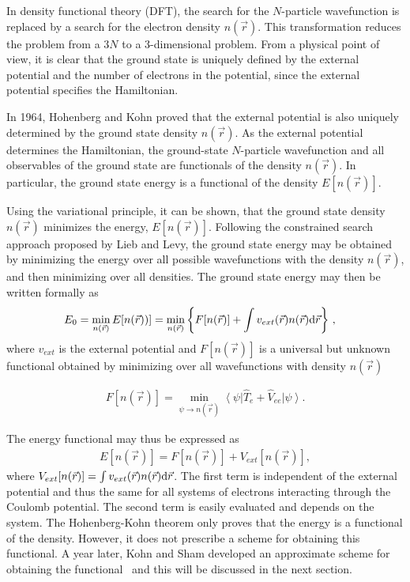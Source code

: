 \documentclass[book.tex]{subfiles}
\begin{document}
In density functional theory (DFT), the search for the $N$-particle wavefunction is replaced by a search for the electron density $n(\vec{r})$. This transformation reduces the problem from a $3N$ to a 3-dimensional problem.  From a physical point of view, it is clear that the ground state is uniquely defined by the external potential and the number of electrons in the potential, since the external potential specifies the Hamiltonian.

In 1964, Hohenberg and Kohn proved that the external potential is also uniquely determined by the ground state density $n(\vec{r})$.\cite{hohenbergkohn:1964} As the external potential determines the Hamiltonian, the ground-state $N$-particle wavefunction and all observables of the ground state are functionals of the density $n(\vec{r})$. In particular, the ground state energy is a functional of the density $E[n(\vec{r})]$. 

Using the variational principle, it can be shown,\cite{kohn:nobel} that the ground state density $n(\vec{r})$ minimizes the energy, $E[n(\vec{r})]$. Following the constrained search approach proposed by Lieb and Levy,\cite{Lieb:icqc:24,levy:preva:26} the ground state energy may be obtained by minimizing the energy over all possible wavefunctions with the density $n(\vec{r})$, and then minimizing over all densities.
The ground state energy may then be written formally as 
\begin{align}
E_0=\min_{n(\vec{r})} E[n(\vec{r}))]&=\min_{n(\vec{r})} \left\{ F[n(\vec{r})]+\int v_{ext}(\vec{r}) n(\vec{r}) \textup{d}\vec{r} \right\} \label{eq:Eafn} \, ,
\end{align}
where $v_{ext}$ is the external potential and $F[n(\vec{r})]$ is a universal but unknown functional obtained by minimizing over all wavefunctions with density $n(\vec{r})$

\begin{align}
F[n(\vec{r})]=\min_{\psi \rightarrow n(\vec{r})} \left< \psi \right|\hat{T}_e + \hat{V}_{ee} \left| \psi\right>.
\end{align}

The energy functional may thus be expressed as
\begin{align}
E[n(\vec{r})]=F[n(\vec{r})]+ V_{ext}[n(\vec{r})],  \label{eq:HKfunctional}
\end{align}
where $V_{ext}[n(\vec{r})]=\int v_{ext}(\vec{r}) n(\vec{r}) \textup{d}\vec{r}$. The first term is independent of the external potential and thus the same for all systems of electrons interacting through the Coulomb potential. The second term is easily evaluated and depends on the system.
The Hohenberg-Kohn theorem only proves that the energy is a functional of the density. However, it does not prescribe a scheme for obtaining this functional.  A year later, Kohn and Sham developed an approximate scheme for obtaining the functional~\cite{kohnsham:1965} and this will be discussed in the next section.
\end{document}
